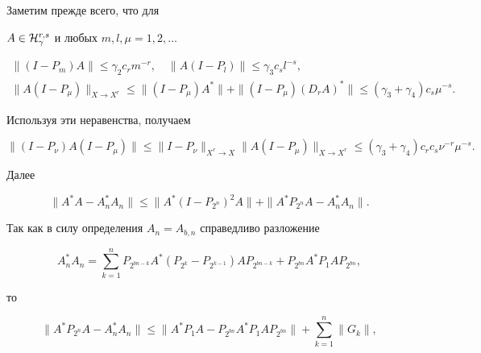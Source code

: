 \begin{pf} Заметим прежде всего, что для


$A\in {\cal H}_\gamma^{r,s}$ и любых $m,l,\mu=1,2,\dotsc$


\begin{gather*}


\|(I-P_m)A\| \le \gamma_2 c_r m^{-r} ,  \quad


\|A(I-P_l)\| \le \gamma_3 c_s l^{-s} ,  \\


\|A(I-P_\mu)\|_{X\to X^r} \le \|(I-P_\mu)A^*\|


+ \|(I-P_\mu)(D_rA)^*\| \le


(\gamma_3+\gamma_4)c_s \mu^{-s} .


\end{gather*}


Используя эти неравенства, получаем


\begin{equation}


\|(I-P_\nu)A(I-P_\mu)\| \le


\|I-P_\nu\|_{X^r\to X}\|A(I-P_\mu)\|_{X\to X^r} \le 


(\gamma_3+\gamma_4)c_r c_s \nu^{-r}\mu^{-s}.


\end{equation}


Далее


\begin{equation}


\|A^*A - A^*_nA_n\|  \le


\|A^*(I-P_{2^n})^2A\| +


\|A^*P_{2^n}A - A^*_nA_n\| .


\end{equation}


Так как в силу определения $A_n=A_{b,n}$ справедливо разложение


$$


A^*_nA_n = \sum_{k=1}^n P_{2^{bn-k}}A^*(P_{2^k}-P_{2^{k-1}})


AP_{2^{bn-k}} + P_{2^{bn}}A^*P_1AP_{2^{bn}},


$$


то


\begin{equation}


\|A^*P_{2^n}A - A^*_nA_n\| \le


\|A^*P_1A - P_{2^{bn}}A^*P_1AP_{2^{bn}}\| +


\sum_{k=1}^n \|G_k\| ,


\end{equation}



\end{pf}
